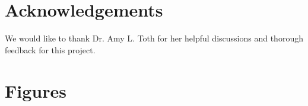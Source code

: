 \documentclass{bmcart}
\begin{document}
\begin{linenumbers}
\begin{backmatter}
\section*{Acknowledgements}
  We would like to thank Dr. Amy L. Toth for her helpful discussions and thorough feedback for this project.
  




\newpage
\section*{Figures}


\end{backmatter}
\end{linenumbers}
\end{document}

